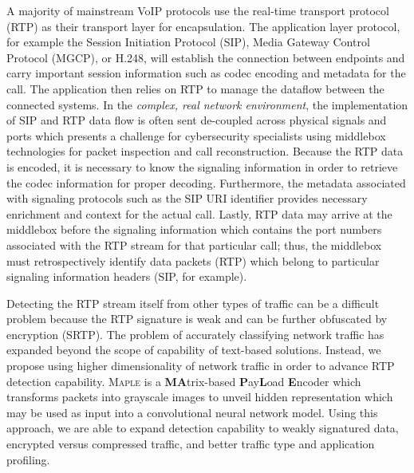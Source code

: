 A majority of mainstream VoIP protocols use the real-time transport protocol (RTP) as their transport layer for encapsulation. The application layer protocol, for example the Session Initiation Protocol (SIP), Media Gateway Control Protocol (MGCP), or H.248, will establish the connection between endpoints and carry important session information such as codec encoding and metadata for the call. The application then relies on RTP to manage the dataflow between the connected systems. In the \textit{complex, real network environment}, the implementation of SIP and RTP data flow is often sent de-coupled across physical signals and ports which presents a challenge for cybersecurity specialists using middlebox technologies for packet inspection and call reconstruction. Because the RTP data is encoded, it is necessary to know the signaling information in order to retrieve the codec information for proper decoding. Furthermore, the metadata associated with signaling protocols such as the SIP URI identifier provides necessary enrichment and context for the actual call. Lastly, RTP data may arrive at the middlebox before the signaling information which contains the port numbers associated with the RTP stream for that particular call; thus, the middlebox must retrospectively identify data packets (RTP) which belong to particular signaling information headers (SIP, for example).

Detecting the RTP stream itself from other types of traffic can be a difficult problem because the RTP signature is weak and can be further obfuscated by encryption (SRTP). The problem of accurately classifying network traffic has expanded beyond the scope of capability of text-based solutions. Instead, we propose using higher dimensionality of network traffic in order to advance RTP detection capability. \textsc{Maple} is a \textbf{MA}trix-based \textbf{P}ay\textbf{L}oad \textbf{E}ncoder which transforms packets into grayscale images to unveil hidden representation which may be used as input into a convolutional neural network model. Using this approach, we are able to expand detection capability to weakly signatured data, encrypted versus compressed traffic, and better traffic type and application profiling.
